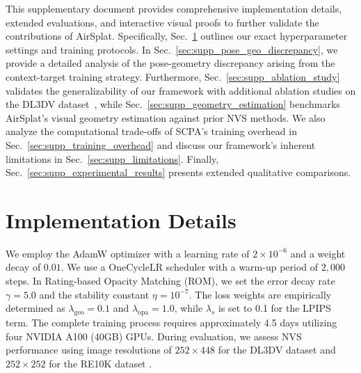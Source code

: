 This supplementary document provides comprehensive implementation details, extended evaluations, and interactive visual proofs to further validate the contributions of AirSplat. Specifically, Sec.~\ref{sec:supp_implementation_details} outlines our exact hyperparameter settings and training protocols. In Sec.~\ref{sec:supp_pose_geo_discrepancy}, we provide a detailed analysis of the pose-geometry discrepancy arising from the context-target training strategy. Furthermore, Sec.~\ref{sec:supp_ablation_study} validates the generalizability of our framework with additional ablation studies on the DL3DV dataset~\cite{ling2024dl3dv}, while Sec.~\ref{sec:supp_geometry_estimation} benchmarks AirSplat's visual geometry estimation against prior NVS methods. We also analyze the computational trade-offs of SCPA's training overhead in Sec.~\ref{sec:supp_training_overhead} and discuss our framework's inherent limitations in Sec.~\ref{sec:supp_limitations}. Finally, Sec.~\ref{sec:supp_experimental_results} presents extended qualitative comparisons.




\section{Implementation Details}
\label{sec:supp_implementation_details}
We employ the AdamW optimizer \cite{loshchilov2017adamw} with a learning rate of $2 \times 10^{-6}$ and a weight decay of $0.01$. 
We use a OneCycleLR \cite{smith2019super} scheduler with a warm-up period of $2,000$ steps. In Rating-based Opacity Matching (ROM), we set the error decay rate $\gamma=5.0$ and the stability constant $\eta=10^{-7}$. 
The loss weights are empirically determined as $\lambda_\text{geo}=0.1$ and $\lambda_\text{opa}=1.0$, while $\lambda_{s}$ is set to 0.1 for the LPIPS term. 
The complete training process requires approximately 4.5 days utilizing four NVIDIA A100 (40GB) GPUs.
During evaluation, we assess NVS performance using image resolutions of $252 \times 448$ for the DL3DV dataset \cite{ling2024dl3dv} and $252 \times 252$ for the RE10K dataset \cite{zhou2018stereo}.

